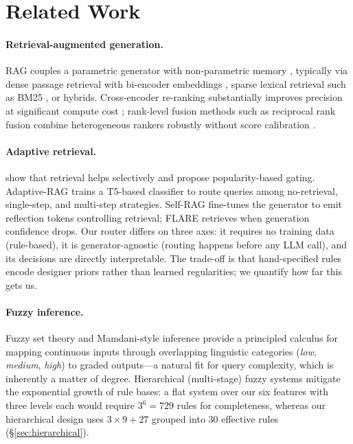 \documentclass[11pt]{article}
\begin{document}
\section{Related Work}

\paragraph{Retrieval-augmented generation.}
RAG couples a parametric generator with non-parametric memory
\citep{lewis2020rag}, typically via dense passage retrieval
\citep{karpukhin2020dpr} with bi-encoder embeddings \citep{reimers2019sbert},
sparse lexical retrieval such as BM25 \citep{robertson2009bm25}, or hybrids.
Cross-encoder re-ranking substantially improves precision at significant
compute cost \citep{nogueira2019rerank}; rank-level fusion methods such as
reciprocal rank fusion combine heterogeneous rankers robustly without score
calibration \citep{cormack2009rrf}.

\paragraph{Adaptive retrieval.}
\citet{mallen2023popqa} show that retrieval helps selectively and propose
popularity-based gating. Adaptive-RAG \citep{jeong2024adaptive} trains a
T5-based classifier to route queries among no-retrieval, single-step, and
multi-step strategies. Self-RAG \citep{asai2024selfrag} fine-tunes the
generator to emit reflection tokens controlling retrieval; FLARE
\citep{jiang2023flare} retrieves when generation confidence drops. Our router
differs on three axes: it requires no training data (rule-based), it is
generator-agnostic (routing happens before any LLM call), and its decisions
are directly interpretable. The trade-off is that hand-specified rules encode
designer priors rather than learned regularities; we quantify how far this
gets us.

\paragraph{Fuzzy inference.}
Fuzzy set theory \citep{zadeh1965fuzzy} and Mamdani-style inference
\citep{mamdani1975experiment} provide a principled calculus for mapping
continuous inputs through overlapping linguistic categories (\emph{low},
\emph{medium}, \emph{high}) to graded outputs---a natural fit for query
complexity, which is inherently a matter of degree. Hierarchical
(multi-stage) fuzzy systems mitigate the exponential growth of rule bases:
a flat system over our six features with three levels each would require
$3^6 = 729$ rules for completeness, whereas our hierarchical design uses
$3 \times 9 + 27$ grouped into $30$ effective rules (\S\ref{sec:hierarchical}).
\end{document}
